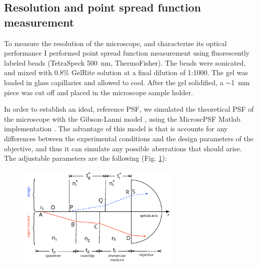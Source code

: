   \subsection{Resolution and point spread function measurement}
    To measure the resolution of the microscope, and characterize its optical performance I performed point spread function measurement using fluorescently labeled beads (TetraSpeck \SI{500}{nm}, ThermoFisher). The beads were sonicated, and mixed with 0.8\% GelRite solution at a final dilution of 1:1000. The gel was loaded in glass capillaries and allowed to cool. After the gel solidified, a $\sim$\SI{1}{mm} piece was cut off and placed in the microscope sample holder.

    In order to establish an ideal, reference PSF, we simulated the theoretical PSF of the microscope with the Gibson-Lanni model \cite{gibson_experimental_1992}, using the MicroscPSF Matlab implementation \cite{li_fast_2017}. The advantage of this model is that is accounts for any differences between the experimental conditions and the design parameters of the objective, and thus it can simulate any possible aberrations that should arise. The adjustable parameters are the following (Fig. \ref{fig:gibson-lanni}): 

    \begin{figure}[htb]
      \centering
      \includegraphics[width=0.7\textwidth]{gibson-lanni}
      \label{fig:gibson-lanni}
    \end{figure}

